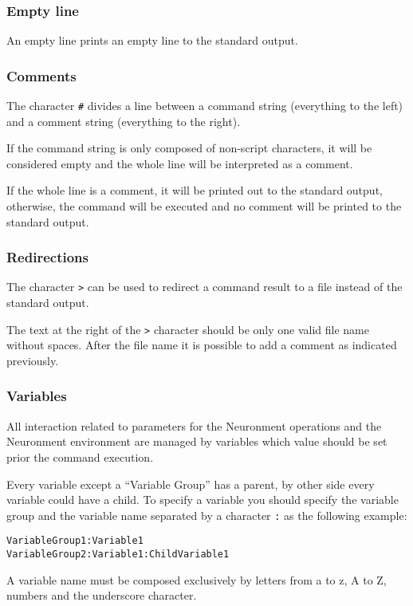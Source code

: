 \subsubsection{Empty line}
An empty line prints an empty line to the standard output.

\subsubsection{Comments}
The character \texttt{\#} divides a line between a command string (everything to the left) and a comment string (everything to the right).

If the command string is only composed of non-script characters, it will be considered empty and the whole line will be interpreted as a comment.

If the whole line is a comment, it will be printed out to the standard output, otherwise, the command will be executed and no comment will be printed to the standard output.

\subsubsection{Redirections}
The character \texttt{>} can be used to redirect a command result to a file instead of the standard output.

The text at the right of the \texttt{>} character should be only one valid file name without spaces. After the file name it is possible to add a comment as indicated previously.

\subsubsection{Variables}
All interaction related to parameters for the Neuronment operations and the Neuronment environment are managed by variables which value should be set prior the command execution.

Every variable except a ``Variable Group'' has a parent, by other side every variable could have a child. To specify a variable you should specify the variable group and the variable name separated by a character \texttt{:} as the following example:

\begin{verbatim}
VariableGroup1:Variable1
VariableGroup2:Variable1:ChildVariable1
\end{verbatim}

A variable name must be composed exclusively by letters from a to z, A to Z, numbers and the underscore character.

